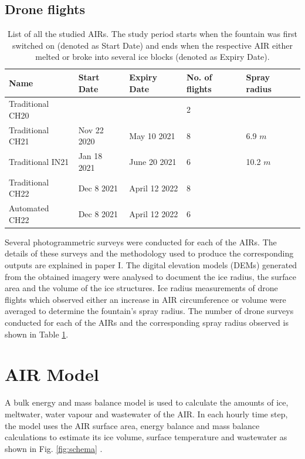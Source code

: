 \subsection{Drone flights}

\begin{table}
  \centering
  \caption{List of all the studied AIRs. The study period starts when the fountain was first switched on
  (denoted as Start Date) and ends when the respective AIR either melted or broke into several ice blocks
(denoted as Expiry Date). }

	\label{tab:AIRs}
	\begin{tabular}{|lllll|}
		\toprule
		\textbf{Name}     & \textbf{Start Date} & \textbf{Expiry Date} & \textbf{No. of flights} & \textbf{Spray radius} \\ \midrule
    Traditional CH20  &  & & 2 & \\
    Traditional CH21  & Nov 22 2020   & May 10 2021 & 8 & 6.9 $m$ \\
    Traditional IN21  & Jan 18 2021   & June 20 2021 & 6 & 10.2 $m$ \\
    Traditional CH22  & Dec 8 2021 & April 12 2022 & 8 & \\
		Automated CH22  &  Dec 8 2021 & April 12 2022 & 6 & \\ \bottomrule
	\end{tabular}
\end{table}

Several photogrammetric surveys were conducted for each of the AIRs. The details of these surveys and the
methodology used to produce the corresponding outputs are explained in paper I. The digital elevation models
(DEMs) generated from the obtained imagery were analysed to document the ice radius, the surface area and the
volume of the ice structures. Ice radius measurements of drone flights which observed either an increase in AIR
circumference or volume were averaged to determine the fountain's spray radius. The number of drone surveys
conducted for each of the AIRs and the corresponding spray radius observed is shown in Table \ref{tab:AIRs}. 

\section{AIR Model}

A bulk energy and mass balance model is used to calculate the amounts of ice, meltwater, water vapour and
wastewater of the AIR. In each hourly time step, the model uses the AIR surface area, energy balance and mass
balance calculations to estimate its ice volume, surface temperature and wastewater as shown in Fig.
\ref{fig:schema} .

